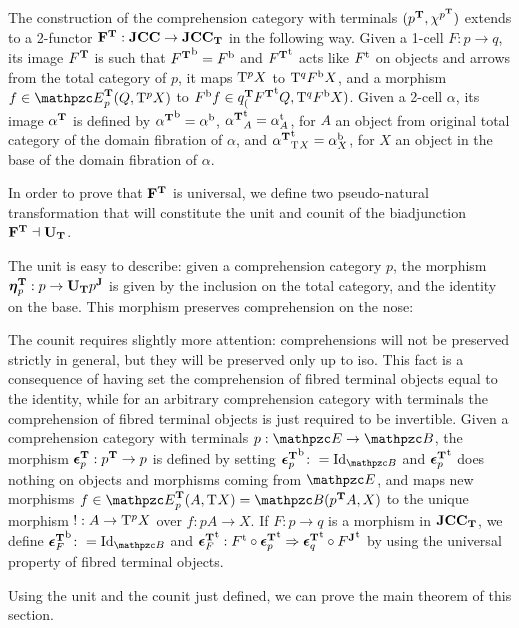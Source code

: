 \documentclass{lmcs} %
\theoremstyle{plain}\newtheorem{satz}[thm]{Satz} %
\begin{document}
The construction of the comprehension category with terminals $({p}^{\mathbf{T}},\chi^{{p}^{\mathbf{T}}})$
extends to a 2-functor $\mathbf{F^T}:\mathbf{JCC}\to\mathbf{JCC_T}$ in the following way. 
Given a 1-cell $F:p\to q$, its image ${F}^{\mathbf{T}}$ is such that 
${{F}^{\mathbf{T}}}^{\mathrm{b}} = {F}^{\mathrm{b}}$ and 
${{F}^{\mathbf{T}}}^{\mathrm{t}}$ acts like ${F}^{\mathrm{t}}$ on objects and arrows from the total category of $p$, 
it maps $\mathrm{T}^{p}X$ to $\mathrm{T}^{q}{F}^{\mathrm{b}}X$, and 
a morphism $f \in\Hom{\JTDomE{p}}(Q,\term{p}X)$ to ${F}^{\mathrm{b}}f \in {q}^{\mathbf{T}}_{(}{{F}^{\mathbf{T}}}^{\mathrm{t}}Q, \mathrm{T}^{q}{F}^{\mathrm{b}}X)$. 
Given a 2-cell $\alpha$, its image ${\alpha}^{\mathbf{T}}$ is defined by 
${{\alpha}^{\mathbf{T}}}^{\mathrm{b}}={\alpha}^{\mathrm{b}}$, 
${{\alpha}^{\mathbf{T}}}^{\mathrm{t}}_A = {\alpha}^{\mathrm{t}}_A$, for $A$ an object from original total category of the domain fibration of $\alpha$, and 
${{\alpha}^{\mathbf{T}}}^{\mathrm{t}}_{\mathrm{T}^{}X} = {\alpha}^{\mathrm{b}}_X$, for $X$ an object in the base of the domain fibration of $\alpha$. 

In order to prove that $\mathbf{F^T}$ is universal, we define two pseudo-natural transformation that will constitute the unit and counit of the biadjunction $\mathbf{F^T}\dashv \mathbf{U_T}$.

			The unit is easy to describe: given a comprehension category $p$, the morphism $\boldsymbol{\eta}^{\mathbf{T}}_{p}:p\to \mathbf{U_T} {p}^{\mathbf{J}}$ is given by the inclusion on the total category, and the identity on the base. This morphism preserves comprehension on the nose: 
			
The counit requires slightly more attention: 
comprehensions will not be preserved strictly in general, but they will be preserved only up to iso. 
This fact is a consequence of having set the comprehension of fibred terminal objects equal to the identity, while for an arbitrary comprehension category with terminals the comprehension of fibred terminal objects is just required to be invertible.
% 
Given a comprehension category with terminals $p:\ct{E}\to\ct{B}$, the morphism $\boldsymbol{\epsilon}^{\mathbf{T}}_{p}:{p}^{\mathbf{T}}\to p$ is defined by setting $\fb{\JTcoun{p}}\colon = \Id{\ct{B}}$ and ${\boldsymbol{\epsilon}^{\mathbf{T}}_{p}}^{\mathrm{t}}$ does nothing on objects and morphisms coming from $\ct{E}$, and maps new morphisms $f\in\Hom{\JTDomE{p}}(A,\term{}X)=\Hom{\ct{B}}(\JTFib{p}A,X)$ to the unique morphism $!:A\to \mathrm{T}^{p}X$ over $f:pA\to X$. 
If $F:p\to q$ is a morphism in $\mathbf{JCC_T}$, we define $\fb{\JTcoun{F}}\colon = \Id{\ct{B}}$ and ${\boldsymbol{\epsilon}^{\mathbf{T}}_{F}}^{\mathrm{t}}:{F}^{\mathrm{t}}\circ{\ensuremath{\boldsymbol{\epsilon}^{\mathbf{T}}_{p}}}^{\mathrm{t}}\Rightarrow {\ensuremath{\boldsymbol{\epsilon}^{\mathbf{T}}_{q}}}^{\mathrm{t}}\circ {\ensuremath{{F}^{\mathbf{J}}}}^{\mathrm{t}}$ by using the universal property of fibred terminal objects.
			
			Using the unit and the counit just defined, we can prove the main theorem of this section.
\end{document}

